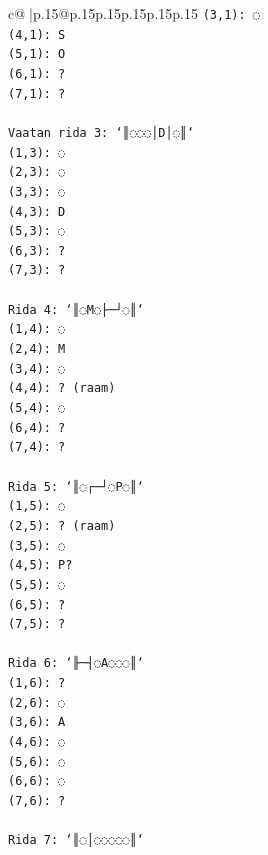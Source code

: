 \documentclass{article}
\begin{document}
{\begin{supertabular}{c@{$\;$}|p{.15\linewidth}@{}p{.15\linewidth}p{.15\linewidth}p{.15\linewidth}p{.15\linewidth}p{.15\linewidth}}
{{{\texttt{(3,1): ◌} \\
\texttt{(4,1): S} \\
\texttt{(5,1): O} \\
\texttt{(6,1): ?} \\
\texttt{(7,1): ?} \\
\\ 
\texttt{Vaatan rida 3: `║◌◌◌│D│◌║`} \\
\texttt{(1,3): ◌} \\
\texttt{(2,3): ◌} \\
\texttt{(3,3): ◌} \\
\texttt{(4,3): D} \\
\texttt{(5,3): ◌} \\
\texttt{(6,3): ?} \\
\texttt{(7,3): ?} \\
\\ 
\texttt{Rida 4: `║◌M◌├─┘◌║`} \\
\texttt{(1,4): ◌} \\
\texttt{(2,4): M} \\
\texttt{(3,4): ◌} \\
\texttt{(4,4): ? (raam)} \\
\texttt{(5,4): ◌} \\
\texttt{(6,4): ?} \\
\texttt{(7,4): ?} \\
\\ 
\texttt{Rida 5: `║◌┌─┘◌P◌║`} \\
\texttt{(1,5): ◌} \\
\texttt{(2,5): ? (raam)} \\
\texttt{(3,5): ◌} \\
\texttt{(4,5): P?} \\
\texttt{(5,5): ◌} \\
\texttt{(6,5): ?} \\
\texttt{(7,5): ?} \\
\\ 
\texttt{Rida 6: `╟─┤◌A◌◌◌║`} \\
\texttt{(1,6): ?} \\
\texttt{(2,6): ◌} \\
\texttt{(3,6): A} \\
\texttt{(4,6): ◌} \\
\texttt{(5,6): ◌} \\
\texttt{(6,6): ◌} \\
\texttt{(7,6): ?} \\
\\ 
\texttt{Rida 7: `║◌│◌◌◌◌◌║`} \\
}}}
\end{supertabular}}
\end{document}
